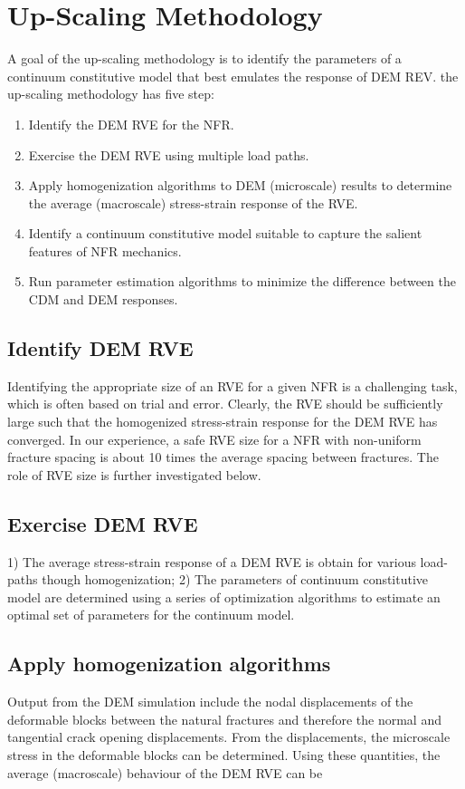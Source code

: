 \section{Up-Scaling Methodology}
A goal of the up-scaling methodology is to identify the parameters of a continuum constitutive model that best emulates the response of DEM REV. the up-scaling methodology has five step: 
\begin{enumerate}
    \item Identify the DEM RVE for the NFR.
	\item Exercise the  DEM RVE using multiple load paths.
	\item Apply homogenization algorithms to DEM (microscale) results to determine the average (macroscale) stress-strain response of the RVE.
	\item Identify a continuum constitutive model suitable to capture the salient features of NFR mechanics.
	\item Run parameter estimation algorithms to minimize the difference between the CDM and DEM responses.
\end{enumerate}

\subsection*{Identify DEM RVE}
Identifying the appropriate size of an RVE for a given NFR is a challenging task, which is often based on trial and error. Clearly, the RVE should be sufficiently large such that the homogenized stress-strain response for the DEM RVE has converged. In our experience, a safe RVE size for a NFR with non-uniform fracture spacing is about 10 times the average spacing between fractures. The role of RVE size is further investigated below.

\subsection*{Exercise DEM RVE}
1) The average stress-strain response of a DEM RVE is obtain for various load-paths though homogenization; 2) The parameters of continuum constitutive model are determined using a series of optimization algorithms to estimate an optimal set of parameters for the continuum model.

\subsection*{Apply homogenization algorithms}
Output from the DEM simulation include the nodal displacements of the deformable blocks between the natural fractures and therefore the normal and tangential crack opening displacements. From the displacements, the microscale stress in the deformable blocks can be determined.  Using these quantities, the average (macroscale) behaviour of the DEM RVE can be  
